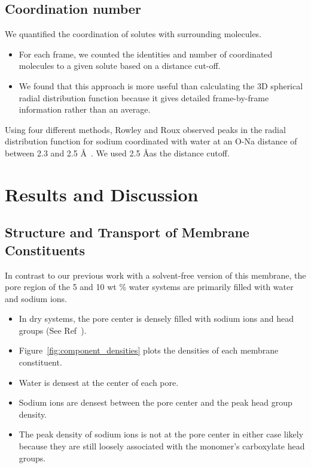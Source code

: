 \documentclass{article}
\begin{document}
  \subsection*{Coordination number}

  We quantified the coordination of solutes with surrounding molecules.
  \begin{itemize}
  	\item For each frame, we counted the identities and number of
  	coordinated molecules to a given solute based on a distance cut-off. 
	\item We found that this approach is more useful than calculating the
	3D spherical radial distribution function because it gives detailed
	frame-by-frame information rather than an average. 
  \end{itemize}
  
  Using four different methods, Rowley and Roux observed peaks in the radial
  distribution function for sodium coordinated with water at an O-Na distance 
  of between 2.3 and 2.5 \AA~\cite{rowley_solvation_2012}. We used 2.5 \AA as
  the distance cutoff.
   
  \section{Results and Discussion}
  
  \subsection*{Structure and Transport of Membrane Constituents}\label{section:membrane_components}
  
  
  In contrast to our previous work with a solvent-free version of this membrane, the pore
  region of the 5 and 10 wt \% water systems are primarily filled with water and sodium
  ions.
  \begin{itemize}
    \item In dry systems, the pore center is densely filled with sodium ions and 
    head groups (See Ref~\cite{coscia_understanding_2019}).
    \item Figure~\ref{fig:component_densities} plots the densities of each
    membrane constituent.
    \item Water is densest at the center of each pore. 
    \item Sodium ions are densest between the pore center and the peak head group density.
    \item The peak density of sodium ions is not at the pore center in either case
    likely because they are still loosely associated with the monomer's 
    carboxylate head groups.
  \end{itemize}
  
\end{document}
